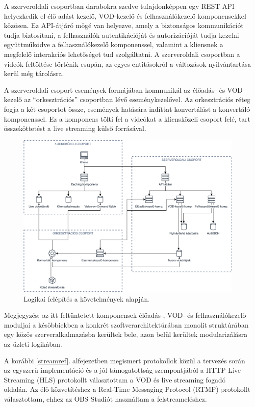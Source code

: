 A szerveroldali csoportban darabokra szedve tulajdonképpen egy REST API helyezkedik el élő adást kezelő, VOD-kezelő és felhasználókezelő komponensekkel közösen. Ez API-átjáró mögé van helyezve, amely a biztonságos kommunikációt tudja biztosítani, a felhasználók autentikációját és autorizációját tudja kezelni együttműködve a felhasználókezelő komponenssel, valamint a kliensnek a megfelelő interakciós lehetőséget tud szolgáltatni. A szerveroldali csoportban a videók feltöltése történik csupán, az egyes entitásokról a változások nyilvántartása kerül még tárolásra.

A szerveroldali csoport események formájában kommunikál az élőadás- és VOD-kezelő az ``orkesztrációs'' csoportban lévő eseménykezelővel. Az orkesztrációs réteg fogja a két csoportot össze, események hatására indíttat konvertálást a konvertáló komponenssel. Ez a komponens tölti fel a videókat a kliensközeli csoport felé, tart összeköttetést a live streaming külső forrásával.

\begin{figure}[h]
	\centering
	\includegraphics[width=140mm, keepaspectratio]{figures/dipterv_highlevel.png}
	\caption{Logikai felépítés a követelmények alapján.}
	\label{fig:highlevel}
\end{figure}

Megjegyzés: az itt feltüntetett komponensek élőadás-, VOD- és felhasználókezelő moduljai a későbbiekben a konkrét szoftverarchitektúrában monolit struktúrában egy közös szerveralkalmazásba kerültek bele, azon belül kerültek modularizálásra az üzleti logikában.

A korábbi \ref{streamref}. alfejezetben megismert protokollok közül a tervezés során az egyszerű implementáció és a jól támogatottság szempontjából a HTTP Live Streaming (HLS) protokollt választottam a VOD és live streaming fogadó oldalán. Az élő közvetítéshez a Real-Time Messaging Protocol (RTMP) protokollt választottam, ehhez az OBS Studiót használtam a felstreameléshez.

